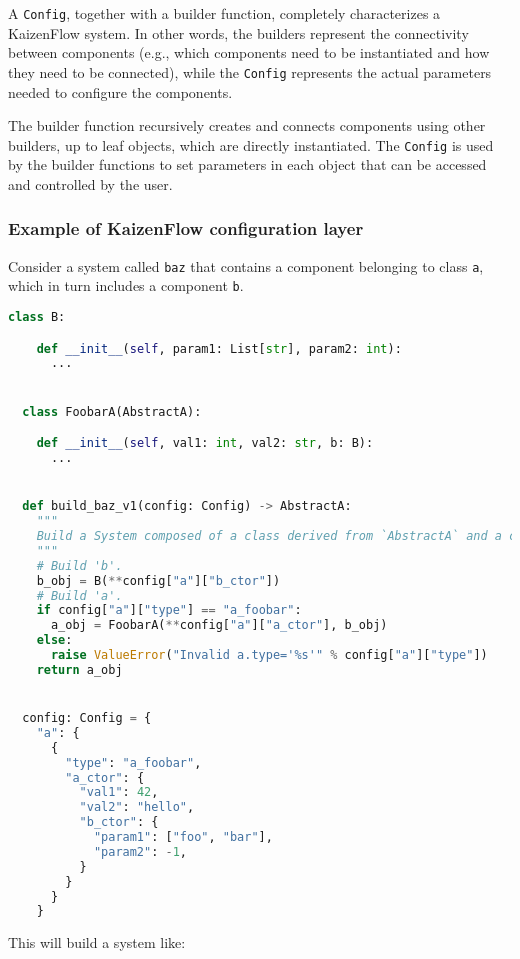 \documentclass[11pt, reqno]{amsart}
\theoremstyle{definition}
\theoremstyle{remark}
\begin{document}
  A \verb|Config|, together with a builder function, completely characterizes a KaizenFlow
  system. In other words, the builders represent the connectivity between components
  (e.g., which components need to be instantiated and how they need to be
  connected), while the \verb|Config| represents the actual parameters needed to
  configure the components.

  The builder function recursively creates and connects components using other
  builders, up to leaf objects, which are directly instantiated. The \verb|Config|
  is used by the builder functions to set parameters in each object that can be accessed
  and controlled by the user.

  \subsubsection{Example of KaizenFlow configuration layer}
  Consider a system called \verb|baz| that contains a component belonging to class
  \verb|a|, which in turn includes a component \verb|b|.

  \begin{lstlisting}[language=Python, caption=Python example]
  class B:

    def __init__(self, param1: List[str], param2: int):
      ...


  class FoobarA(AbstractA):

    def __init__(self, val1: int, val2: str, b: B):
      ...


  def build_baz_v1(config: Config) -> AbstractA:
    """
    Build a System composed of a class derived from `AbstractA` and a class `B`.
    """
    # Build 'b'.
    b_obj = B(**config["a"]["b_ctor"])
    # Build 'a'.
    if config["a"]["type"] == "a_foobar":
      a_obj = FoobarA(**config["a"]["a_ctor"], b_obj)
    else:
      raise ValueError("Invalid a.type='%s'" % config["a"]["type"])
    return a_obj


  config: Config = {
    "a": {
      {
        "type": "a_foobar",
        "a_ctor": {
          "val1": 42,
          "val2": "hello",
          "b_ctor": {
            "param1": ["foo", "bar"],
            "param2": -1,
          }
        }
      }
    }
  \end{lstlisting}

  This will build a system like:

\end{document}
